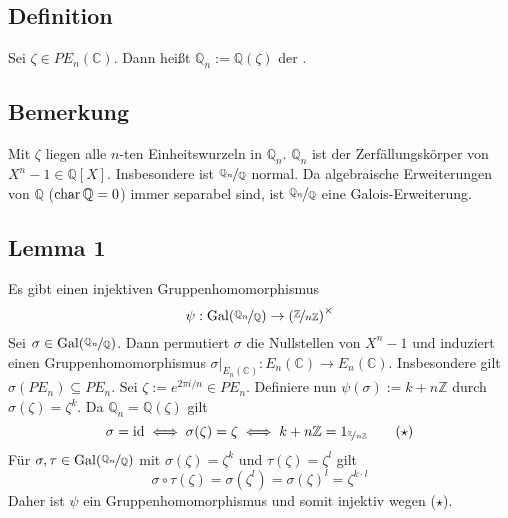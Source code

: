 \subsection[Definition: $n$-ter Kreisteilungskörper]{Definition} %
\label{sub:198}
Sei $\zeta \in PE_n(\mathds{C})$. Dann heißt $\mathds{Q}_n := \mathds{Q}(\zeta)$ der .

\subsection[Bemerkung: Eigenschaften des $n$-ten Kreisteilungskörpers]{Bemerkung} %
\label{sub:199}
Mit $\zeta$ liegen alle $n$-ten Einheitswurzeln in $\mathds{Q}_n$.
$\mathds{Q}_n$ ist der Zerfällungskörper von $X^n-1 \in \mathds{Q}[X]$. Insbesondere ist $\nicefrac{\mathds{Q}_n}{\mathds{Q}}$ normal. Da algebraische Erweiterungen von 
$\mathds{Q}$ ($\Char \mathds{Q}=0$) immer separabel sind, ist $\nicefrac{\mathds{Q}_n}{\mathds{Q}}$ eine Galois-Erweiterung.

\subsection[Lemma 1: Es ex. ein injektiver Gruppenhomomorphismus $\Gal(\nicefrac{\mathds{Q}_n}{\mathds{Q}})\to\enbrace*{\nicefrac{\mathds{Z}}{n\mathds{Z}}}^\times$]{Lemma 1} %
\label{sub:1910}
Es gibt einen injektiven Gruppenhomomorphismus
\[
	\psi : \Gal( \nicefrac{\mathds{Q}_n}{\mathds{Q}}) \to \enbrace*{\nicefrac{\mathds{Z}}{n \mathds{Z}}}^\times 
\]
Sei $\sigma \in \Gal \enbrace*{\nicefrac{\mathds{Q}_n}{\mathds{Q}}} $. Dann permutiert $\sigma$ die Nullstellen von $X^n-1$ und induziert einen Gruppenhomomorphismus 
$\sigma|_{E_n(\mathds{C})} : E_n(\mathds{C}) \to E_n(\mathds{C})$. Insbesondere gilt $\sigma(PE_n)  \subseteq PE_n$. Sei $\zeta := e^{2 \pi  i/n} \in PE_n$. Definiere nun 
$\psi (\sigma) := k+ n \mathds{Z}$ durch
$\sigma(\zeta) = \zeta^k$. Da $\mathds{Q}_n = \mathds{Q}(\zeta)$ gilt
\[
	\sigma = \id \iff  \sigma(\zeta) = \zeta \iff k+ n \mathds{Z}  = 1_{\nicefrac{\mathds{Z}}{n \mathds{Z}}} \tag{$\star$}
\]
Für $\sigma, \tau \in \Gal(\nicefrac{\mathds{Q}_n}{\mathds{Q}})$ mit $\sigma(\zeta) = \zeta^k$ und $\tau (\zeta) = \zeta^l$ gilt
\[
	\sigma \circ \tau(\zeta) = \sigma (\zeta^l) = \sigma(\zeta)^l = \zeta^{k \cdot l}
\]
Daher ist $\psi$ ein Gruppenhomomorphismus und somit injektiv wegen ($\star$). \bewende

